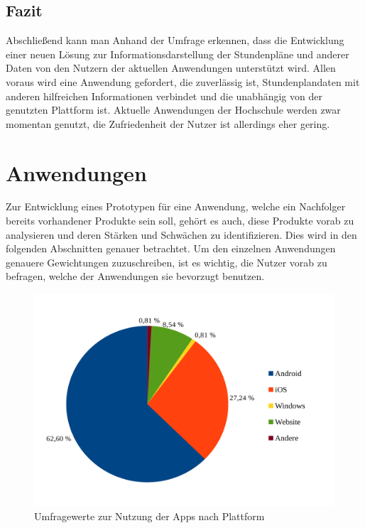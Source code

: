 \subsection{Fazit}

Abschließend kann man Anhand der Umfrage erkennen, dass die Entwicklung einer neuen Lösung zur Informationsdarstellung der Stundenpläne und anderer Daten von den Nutzern der aktuellen Anwendungen unterstützt wird. Allen voraus wird eine Anwendung gefordert, die zuverlässig ist, Stundenplandaten mit anderen hilfreichen Informationen verbindet und die unabhängig von der genutzten Plattform ist. Aktuelle Anwendungen der Hochschule werden zwar momentan genutzt, die Zufriedenheit der Nutzer ist allerdings eher gering.

\section{Anwendungen\label{sec:apps}}

Zur Entwicklung eines Prototypen für eine Anwendung, welche ein Nachfolger bereits vorhandener Produkte sein soll, gehört es auch, diese Produkte vorab zu analysieren und deren Stärken und Schwächen zu identifizieren. Dies wird in den folgenden Abschnitten genauer betrachtet. Um den einzelnen Anwendungen genauere Gewichtungen zuzuschreiben, ist es wichtig, die Nutzer vorab zu befragen, welche der Anwendungen sie bevorzugt benutzen. 

\begin{figure}[h]
	\begin{center}
		\includegraphics[width=12 cm]{Bilder/Umfrage/Umfrage_Appnutzung.pdf}
		\caption{Umfragewerte zur Nutzung der Apps nach Plattform\label{fig:umfrage_appnutzung}\protect\footnotemark}
	\end{center}
\end{figure}

